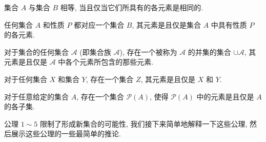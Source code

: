 \documentclass[10pt,UTF8]{book} %
\begin{document}
\setcounter{axiom}{0}
\begin{axiom}[外延公理]
    集合 $A$ 与集合 $B$ 相等, 当且仅当它们所具有的各元素是相同的.
\end{axiom}
\begin{axiom}[分离公理]
    任何集合 $A$ 和性质 $P$ 都对应一个集合 $B$, 
    其元素是且仅是集合 $A$ 中具有性质 $P$ 的各元素.
\end{axiom}





\begin{axiom}[并集公理]
    对于集合的任何集合 $\mathscr{A}$ (即集合族 $\mathscr{A}$), 存在一个被称为
    $\mathscr{A}$ 的并集的集合 $\cup \mathscr{A}$, 其元素是且仅是 $\mathscr{A}$
    中各个元素所包含的那些元素.
\end{axiom}


\begin{axiom}[配对公理]
    对于任何集合 $X$ 和集合 $Y$, 存在一个集合 $Z$, 其元素是且仅是 $X$ 和 $Y$.
\end{axiom}

\begin{axiom}[子集之集公理]
    对于任意给定的集合 $A$, 存在一个集合 $\mathscr{P}(A)$, 使得 $\mathscr{P}(A)$
    中的元素是且仅是 $A$ 的各子集. 
\end{axiom}


公理 $1 \sim 5$ 限制了形成新集合的可能性,
我们接下来简单地解释一下这些公理, 然后展示这些公理的一些最简单的推论.
\end{document}
